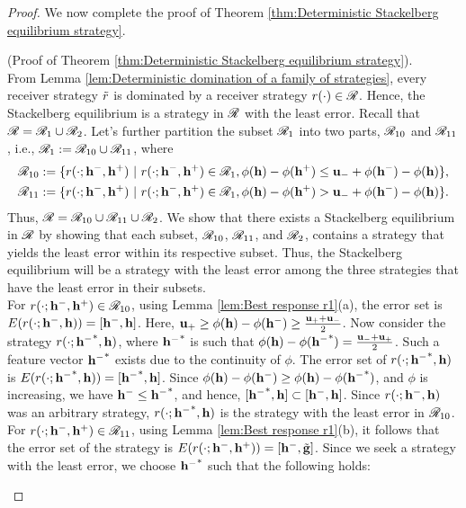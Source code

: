 \begin{proof}
We now complete the proof of Theorem \ref{thm:Deterministic Stackelberg equilibrium strategy}.
\begin{apdxproof}(Proof of Theorem \ref{thm:Deterministic Stackelberg equilibrium strategy}).\\
	From Lemma \ref{lem:Deterministic domination of a family of strategies}, every receiver strategy $\tilde{r}$ is dominated by a receiver strategy $r(\cdot) \in \mathscr{R}$. Hence, the Stackelberg equilibrium is a strategy in $\mathscr{R}$ with the least error. Recall that $\mathscr{R} = \mathscr{R}_1 \cup \mathscr{R}_2$. Let's further partition the subset $\mathscr{R}_1$ into two parts, $\mathscr{R}_{10}$ and $\mathscr{R}_{11}$, i.e., $\mathscr{R}_1 := \mathscr{R}_{10} \cup \mathscr{R}_{11}$, where
	\[
	\begin{aligned}
		\mathscr{R}_{10} &:= \{r(\cdot;\mathbf{h^{-}},\mathbf{h^{+}}) \ |\ r(\cdot;\mathbf{h^{-}},\mathbf{h^{+}}) \in \mathscr{R}_1, \phi(\mathbf{h}) - \phi(\mathbf{h^{+}}) \leq \mathbf{u_-} + \phi(\mathbf{h^{-}}) - \phi(\mathbf{h})\}, \\
		\mathscr{R}_{11} &:= \{r(\cdot;\mathbf{h^{-}},\mathbf{h^{+}}) \ |\ r(\cdot;\mathbf{h^{-}},\mathbf{h^{+}}) \in \mathscr{R}_1, \phi(\mathbf{h}) - \phi(\mathbf{h^{+}}) > \mathbf{u_-} + \phi(\mathbf{h^{-}}) - \phi(\mathbf{h})\}.
	\end{aligned}
	\]
Thus, $\mathscr{R} = \mathscr{R}_{10} \cup \mathscr{R}_{11} \cup \mathscr{R}_2$. We show that there exists a Stackelberg equilibrium in $\mathscr{R}$ by showing that each subset, $\mathscr{R}_{10}$, $\mathscr{R}_{11}$, and $\mathscr{R}_2$, contains a strategy that yields the least error within its respective subset. Thus, the Stackelberg equilibrium will be a strategy with the least error among the three strategies that have the least error in their subsets.\\
	For $r(\cdot;\mathbf{h^{-}},\mathbf{h^{+}}) \in \mathscr{R}_{10}$, using Lemma \ref{lem:Best response r1}(a), the error set is $E(r(\cdot;\mathbf{h^{-}},\mathbf{h})) = [\mathbf{h^{-}},\mathbf{h}]$. Here, $\mathbf{u_+} \geq \phi(\mathbf{h}) - \phi(\mathbf{h^{-}}) \geq \frac{\mathbf{u_+} + \mathbf{u_-}}{2}$. Now consider the strategy $r(\cdot;\mathbf{h^{-}}^*,\mathbf{h})$, where $\mathbf{h^{-}}^*$ is such that $\phi(\mathbf{h}) - \phi(\mathbf{h^{-}}^*) = \frac{\mathbf{u_-} + \mathbf{u_+}}{2}$. Such a feature vector $\mathbf{h^{-}}^*$ exists due to the continuity of $\phi$. The error set of $r(\cdot;\mathbf{h^{-}}^*,\mathbf{h})$ is $E(r(\cdot;\mathbf{h^{-}}^*,\mathbf{h})) = [\mathbf{h^{-}}^*,\mathbf{h}]$. Since $\phi(\mathbf{h}) - \phi(\mathbf{h^{-}}) \geq \phi(\mathbf{h}) - \phi(\mathbf{h^{-}}^*)$, and $\phi$ is increasing, we have $\mathbf{h^{-}} \leq \mathbf{h^{-}}^*$, and hence, $[\mathbf{h^{-}}^*,\mathbf{h}] \subset [\mathbf{h^{-}},\mathbf{h}]$. Since $r(\cdot;\mathbf{h^{-}},\mathbf{h})$ was an arbitrary strategy, $r(\cdot;\mathbf{h^{-}}^*,\mathbf{h})$ is the strategy with the least error in $\mathscr{R}_{10}$.\\
	For $r(\cdot;\mathbf{h^{-}},\mathbf{h^{+}}) \in \mathscr{R}_{11}$, using Lemma \ref{lem:Best response r1}(b), it follows that the error set of the strategy is $E(r(\cdot;\mathbf{h^{-}},\mathbf{h^{+}})) = [\mathbf{h^{-}},\tilde{\mathbf{g}}]$. Since we seek a strategy with the least error, we choose $\mathbf{h^{-}}^*$ such that the following holds:

\end{apdxproof}
\end{proof}
